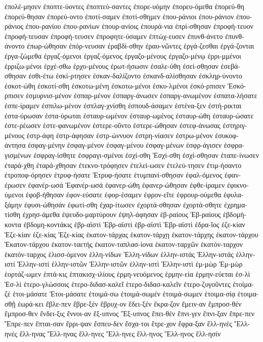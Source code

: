{ἐπολέ-μησεν
ἐποπτε-ύοντες
ἐποπτεύ-σαντες
ἐπορε-υόμην
ἐπορευ-όμεθα
ἐπορεύ-θη
ἐπορεύ-θησαν
ἐπορεύ-οντο
ἐποτί-σαμεν
ἐποτί-σθημεν
ἐπου-ράνιοι
ἐπου-ράνιον
ἐπου-ράνιος
ἐπου-ρανίου
ἐπου-ρανίων
ἐπουρ-ανίοις
ἐπουρά-νια
ἐπρί-σθησαν
ἐπροφή-τευον
ἐπροφή-τευσαν
ἐπροφή-τευσεν
ἐπροφητε-ύσαμεν
ἐπτώχ-ευσεν
ἐπυνθ-άνετο
ἐπυνθ-άνοντο
ἐπωρ-ώθησαν
ἐπόρ-νευσαν
ἐραβδί-σθην
ἐραυ-νῶντες
ἐργά-ζεσθαι
ἐργά-ζονται
ἐργα-ζώμεθα
ἐργαζ-όμενοι
ἐργαζ-όμενος
ἐργαζο-μένους
ἐργαζο-μένῳ
ἐρρι-μμένοι
ἐρριζω-μένοι
ἐρχέ-σθω
ἐρχο-μένους
ἐρωτ-ήσωσιν
ἐσαλε-ύθη
ἐσεί-σθησαν
ἐσεβά-σθησαν
ἐσθι-έτω
ἐσκί-ρτησεν
ἐσκαν-δαλίζοντο
ἐσκανδ-αλίσθησαν
ἐσκληρ-ύνοντο
ἐσκοτ-ώθη
ἐσκοτί-σθη
ἐσκοτω-μένη
ἐσκοτω-μένοι
ἐσκυ-λμένοι
ἐσκό-ρπισεν
Ἐσκό-ρπισεν
ἐσμυρνισ-μένον
ἐσπαρ-μένον
ἐσπαργ-άνωσεν
ἐσπαργ-ανωμένον
ἐσπατα-λήσατε
ἐσπε-ίραμεν
ἐσπιλω-μένον
ἐσπλαγ-χνίσθη
ἐσπουδ-άσαμεν
ἐστένα-ξεν
ἐστή-ρικται
ἐστα-ύρωσαν
ἐστα-ύρωται
ἐσταυρ-ωμένον
ἐσταυρ-ωμένος
ἐσταυρ-ώθη
ἐσταυρ-ώσατε
ἐστε-ρέωσεν
ἐστε-φανωμένον
ἐστερε-οῦντο
ἐστερε-ώθησαν
ἐστεφ-άνωσας
ἐστηριγ-μένους
ἐστρ-άφη
ἐστρ-άφησαν
ἐστρ-ώννυον
ἐστρη-νίασεν
ἐστρω-μένον
ἐσυκοφ-άντησα
ἐσφαγ-μένην
ἐσφαγ-μένον
ἐσφαγ-μένου
ἐσφαγ-μένων
ἐσφρ-άγισεν
ἐσφρα-γισμένων
ἐσφραγ-ίσθητε
ἐσφραγι-σμένοι
ἐσχί-σθη
Ἐσχί-σθη
ἐσχί-σθησαν
ἐταπε-ίνωσεν
ἐταρά-χθη
ἐταρά-χθησαν
ἐτεκνο-τρόφησεν
ἐτελεί-ωσεν
ἐτελεύ-τησεν
ἐτιμ-ήσαντο
ἐτροποφ-όρησεν
ἐτρυφ-ήσατε
Ἐτρυφ-ήσατε
ἐτυμπανί-σθησαν
ἐφαλ-όμενος
ἐφαν-έρωσεν
ἐφανέρ-ωσά
Ἐφανέρ-ωσά
ἐφανερ-ώθη
ἐφανερ-ώθησαν
ἐφθε-ίραμεν
ἐφικνο-ύμενοι
ἐφοβ-ήθησαν
ἐφον-εύσατε
ἐφορ-έσαμεν
ἐφρον-εῖτε
ἐφρουρ-ούμεθα
ἐφυλα-ξάμην
ἐφυσι-ώθησάν
ἐφωτί-σθη
ἐχαρ-ίτωσεν
ἐχορτά-σθησαν
ἐχορτά-σθητε
ἐχρημα-τίσθη
ἐχρησ-άμεθα
ἐψευδο-μαρτύρουν
ἐψηλ-άφησαν
ἑβ-ραίους
Ἑβ-ραίους
ἑβδομή-κοντα
ἑβδομη-κοντάκις
ἑβρ-αϊστί
Ἑβρ-αϊστί
ἑβρ-αϊστὶ
Ἑβρ-αϊστὶ
ἑδρα-ῖος
ἑζε-κίαν
Ἑζε-κίαν
ἑζε-κίας
Ἑζε-κίας
ἑκατον-τάρχας
ἑκατον-τάρχῃ
ἑκατον-τάρχης
ἑκατον-τάρχου
Ἑκατον-τάρχου
ἑκατον-ταετής
ἑκατον-ταπλασ-ίονα
ἑκατον-ταρχῶν
ἑκατόν-ταρχον
ἑκατόν-ταρχος
ἑλισσ-όμενον
ἑλλη-νίδων
Ἑλλη-νίδων
ἑλλην-ιστάς
Ἑλλην-ιστάς
ἑλλην-ιστί
Ἑλλην-ιστί
ἑλλην-ιστῶν
Ἑλλην-ιστῶν
ἑλλην-ιστὶ
Ἑλλην-ιστὶ
ἑμ-μὼρ
Ἑμ-μὼρ
ἑορτάζ-ωμεν
ἑπτά-κις
ἑπτακισχ-ιλίους
ἑρμη-νευόμενος
ἑρμην-εία
ἑρμην-εύεται
ἑσ-λὶ
Ἑσ-λὶ
ἑτερο-γλώσσοις
ἑτερο-διδασ-καλεῖ
ἑτερο-διδασ-καλεῖν
ἑτερο-ζυγοῦντες
ἑτοίμα-ζέ
ἑτοι-μάσατε
Ἑτοι-μάσατε
ἑτοιμά-σω
ἑτοιμά-σωμέν
ἑτοιμά-σωμεν
ἑτοιμα-σίᾳ
ἑτοιμα-σθῇ
ἑωρά-κει
ἔβλε-πεν
ἔβρε-ξέν
ἔβρυχ-ον
ἔδει-ξέν
ἔκρα-ζον
ἔμειν-αν
ἔμπροσ-θέν
ἔμπροσ-θεν
ἔνδει-ξις
ἔννοι-αν
ἔξ-υπνος
Ἔξ-υπνος
ἔπει-θέν
ἔπνι-γεν
ἔπνι-ξαν
ἔπρε-πεν
Ἔπρε-πεν
ἔπται-σαν
ἔρρι-ψαν
ἔσπευ-δεν
ἔσχα-τοι
ἔτρε-χον
ἔφρα-ξαν
ἕλλ-ηνές
Ἕλλ-ηνές
ἕλλ-ηνας
Ἕλλ-ηνας
ἕλλ-ηνες
Ἕλλ-ηνες
ἕλλ-ηνος
Ἕλλ-ηνος
ἕλλ-ησίν
}
